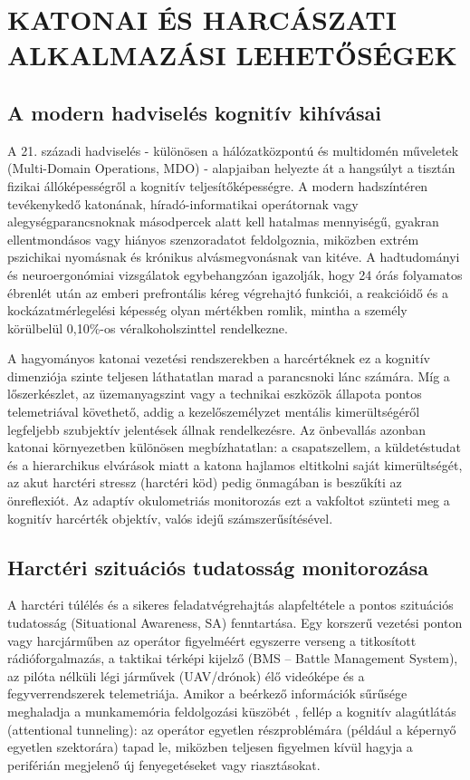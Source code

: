 \documentclass[12pt,a4paper,oneside]{book}
\begin{document}
\section{KATONAI ÉS HARCÁSZATI ALKALMAZÁSI LEHETŐSÉGEK}

\subsection{A modern hadviselés kognitív kihívásai}

A 21. századi hadviselés - különösen a hálózatközpontú és multidomén műveletek (Multi-Domain Operations, MDO) - alapjaiban helyezte át a hangsúlyt a tisztán fizikai állóképességről a kognitív teljesítőképességre. A modern hadszíntéren tevékenykedő katonának, híradó-informatikai operátornak vagy alegységparancsnoknak másodpercek alatt kell hatalmas mennyiségű, gyakran ellentmondásos vagy hiányos szenzoradatot feldolgoznia, miközben extrém pszichikai nyomásnak és krónikus alvásmegvonásnak van kitéve. A hadtudományi és neuroergonómiai vizsgálatok egybehangzóan igazolják, hogy 24 órás folyamatos ébrenlét után az emberi prefrontális kéreg végrehajtó funkciói, a reakcióidő és a kockázatmérlegelési képesség olyan mértékben romlik, mintha a személy körülbelül 0,10\%-os véralkoholszinttel rendelkezne.

A hagyományos katonai vezetési rendszerekben a harcértéknek ez a kognitív dimenziója szinte teljesen láthatatlan marad a parancsnoki lánc számára. Míg a lőszerkészlet, az üzemanyagszint vagy a technikai eszközök állapota pontos telemetriával követhető, addig a kezelőszemélyzet mentális kimerültségéről legfeljebb szubjektív jelentések állnak rendelkezésre. Az önbevallás azonban katonai környezetben különösen megbízhatatlan: a csapatszellem, a küldetéstudat és a hierarchikus elvárások miatt a katona hajlamos eltitkolni saját kimerültségét, az akut harctéri stressz (harctéri köd) pedig önmagában is beszűkíti az önreflexiót. Az adaptív okulometriás monitorozás ezt a vakfoltot szünteti meg a kognitív harcérték objektív, valós idejű számszerűsítésével.

\subsection{Harctéri szituációs tudatosság monitorozása}

A harctéri túlélés és a sikeres feladatvégrehajtás alapfeltétele a pontos szituációs tudatosság (Situational Awareness, SA) fenntartása. Egy korszerű vezetési ponton vagy harcjárműben az operátor figyelméért egyszerre verseng a titkosított rádióforgalmazás, a taktikai térképi kijelző (BMS -- Battle Management System), az pilóta nélküli légi járművek (UAV/drónok) élő videóképe és a fegyverrendszerek telemetriája. Amikor a beérkező információk sűrűsége meghaladja a munkamemória feldolgozási küszöbét \cite{cowan2010, wang2026}, fellép a kognitív alagútlátás (attentional tunneling): az operátor egyetlen részproblémára (például a képernyő egyetlen szektorára) tapad le, miközben teljesen figyelmen kívül hagyja a periférián megjelenő új fenyegetéseket vagy riasztásokat.
\end{document}
